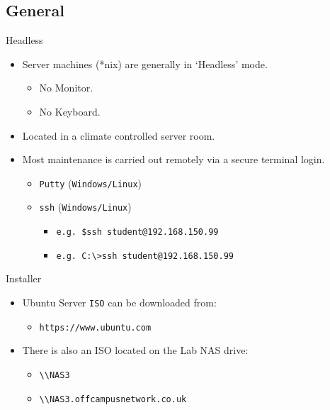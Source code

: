 \documentclass{beamer}
\begin{document}
\subsection{General}
\begin{frame}{Headless}
  \begin{itemize}
    \item Server machines (*nix) are generally in `Headless' mode.
    \begin{itemize}
      \item No Monitor.
      \item No Keyboard.
      \end{itemize}
    \item Located in a climate controlled server room.
    \item Most maintenance is carried out remotely via a secure terminal login.
      \begin{itemize}
        \item \texttt{Putty} (\texttt{Windows/Linux})
        \item \texttt{ssh} (\texttt{Windows/Linux})
          \begin{itemize}
            \item \texttt{e.g. \$ssh student@192.168.150.99}
            \item \texttt{e.g. C:\textbackslash\textgreater ssh student@192.168.150.99}
          \end{itemize}
        \end{itemize}
  \end{itemize}
\end{frame}

\begin{frame}{Installer}
  \begin{itemize}
    \item Ubuntu Server \texttt{ISO} can be downloaded from:
      \begin{itemize}
        \item \texttt{https://www.ubuntu.com}
      \end{itemize}
    \item There is also an ISO located on the Lab NAS drive:
      \begin{itemize}
        \item \texttt{\textbackslash\textbackslash NAS3}
        \item \texttt{\textbackslash\textbackslash NAS3.offcampusnetwork.co.uk}
      \end{itemize}
  \end{itemize}
\end{frame}
\end{document}
